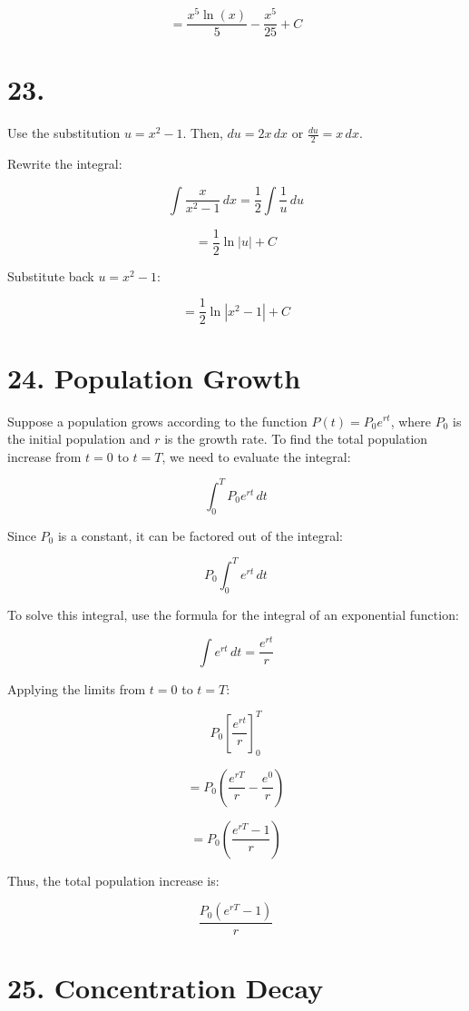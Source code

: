 \documentclass{article}
\begin{document}
\[
= \frac{x^5 \ln(x)}{5} - \frac{x^5}{25} + C
\]

\section*{23.}

Use the substitution \( u = x^2 - 1 \). Then, \( du = 2x \, dx \) or \( \frac{du}{2} = x \, dx \).

Rewrite the integral:

\[
\int \frac{x}{x^2 - 1} \, dx = \frac{1}{2} \int \frac{1}{u} \, du
\]

\[
= \frac{1}{2} \ln |u| + C
\]

Substitute back \( u = x^2 - 1 \):

\[
= \frac{1}{2} \ln |x^2 - 1| + C
\]


\section*{24. Population Growth}

Suppose a population grows according to the function \( P(t) = P_0 e^{rt} \), where \( P_0 \) is the initial population and \( r \) is the growth rate. To find the total population increase from \( t = 0 \) to \( t = T \), we need to evaluate the integral:

\[
\int_{0}^{T} P_0 e^{rt} \, dt
\]

Since \( P_0 \) is a constant, it can be factored out of the integral:

\[
P_0 \int_{0}^{T} e^{rt} \, dt
\]

To solve this integral, use the formula for the integral of an exponential function:

\[
\int e^{rt} \, dt = \frac{e^{rt}}{r}
\]

Applying the limits from \( t = 0 \) to \( t = T \):

\[
P_0 \left[ \frac{e^{rt}}{r} \right]_{0}^{T}
\]

\[
= P_0 \left( \frac{e^{rT}}{r} - \frac{e^{0}}{r} \right)
\]

\[
= P_0 \left( \frac{e^{rT} - 1}{r} \right)
\]

Thus, the total population increase is:

\[
\frac{P_0 (e^{rT} - 1)}{r}
\]

\section*{25. Concentration Decay}
\end{document}
